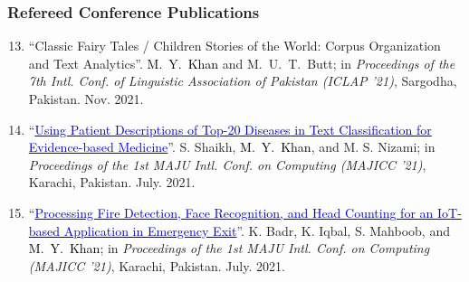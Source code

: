 \documentclass[a4paper, 10pt]{article}
\begin{document}
\subsubsection*{{Refereed Conference Publications}}
\begin{enumerate}
\setcounter{enumi}{12}
\itemsep-4pt






\item ``Classic Fairy Tales / Children Stories of the World: Corpus Organization and Text Analytics''. \textcolor{Black}{M.~Y.~Khan} and M.~U.~T.~Butt; in \emph{Proceedings of the 7th Intl. Conf. of Linguistic Association of Pakistan (ICLAP '21)}, Sargodha, Pakistan. Nov. 2021. %

\item ``\href{https://ieeexplore.ieee.org/document/9526252}{\textcolor{MediumBlue}{Using Patient Descriptions of Top-20 Diseases in Text Classification for Evidence-based Medicine}}''. S. Shaikh, \textcolor{Black}{M.~Y.~Khan}, and M. S. Nizami; in \emph{Proceedings of the 1st MAJU Intl. Conf. on Computing (MAJICC '21)}, Karachi, Pakistan. July. 2021.

\item ``\href{https://ieeexplore.ieee.org/document/9526261}{\textcolor{MediumBlue}{Processing Fire Detection, Face Recognition, and Head Counting for an IoT-based Application in Emergency Exit}}''. K. Badr, K. Iqbal, S. Mahboob, and \textcolor{Black}{M.~Y.~Khan}; in \emph{Proceedings of the 1st MAJU Intl. Conf. on Computing (MAJICC '21)}, Karachi, Pakistan. July. 2021.


\end{enumerate}
\end{document}
